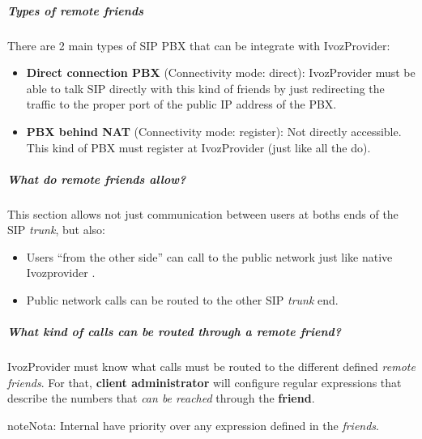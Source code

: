 \documentclass[letterpaper,10pt,spanish]{sphinxmanual}
\begin{document}
\subparagraph{Types of remote friends}
\label{administration_portal/client/vpbx/routing_endpoints/friends/remote_friends:types-of-remote-friends}
There are 2 main types of SIP PBX that can be integrate with IvozProvider:
\begin{itemize}
\item {} 
\textbf{Direct connection PBX} (Connectivity mode: direct): IvozProvider must be able to talk SIP directly with
this kind of friends by just redirecting the traffic to the proper port of
the public IP address of the PBX.

\item {} 
\textbf{PBX behind NAT} (Connectivity mode: register): Not directly accessible. This kind of PBX must register at
IvozProvider (just like all the {\hyperref[administration_portal/client/vpbx/terminals:terminals]{}} do).

\end{itemize}


\subparagraph{What do remote friends allow?}
\label{administration_portal/client/vpbx/routing_endpoints/friends/remote_friends:what-do-remote-friends-allow}
This section allows not just communication between users at boths ends of the
SIP \emph{trunk}, but also:
\begin{itemize}
\item {} 
Users ``from the other side'' can call to the public network just like native
Ivozprovider {\hyperref[administration_portal/client/vpbx/users:users]{}}.

\item {} 
Public network calls can be routed to the other SIP \emph{trunk} end.

\end{itemize}


\subparagraph{What kind of calls can be routed through a \emph{remote friend}?}
\label{administration_portal/client/vpbx/routing_endpoints/friends/remote_friends:what-kind-of-calls-can-be-routed-through-a-remote-friend}
IvozProvider must know what calls must be routed to the different defined \emph{remote friends}.
For that, \textbf{client administrator} will configure regular expressions that
describe the numbers that \emph{can be reached} through the \textbf{friend}.

\begin{notice}{note}{Nota:}
Internal {\hyperref[administration_portal/client/vpbx/extensions:extensions]{}} have priority over any expression
defined in the \emph{friends}.
\end{notice}
\end{document}
